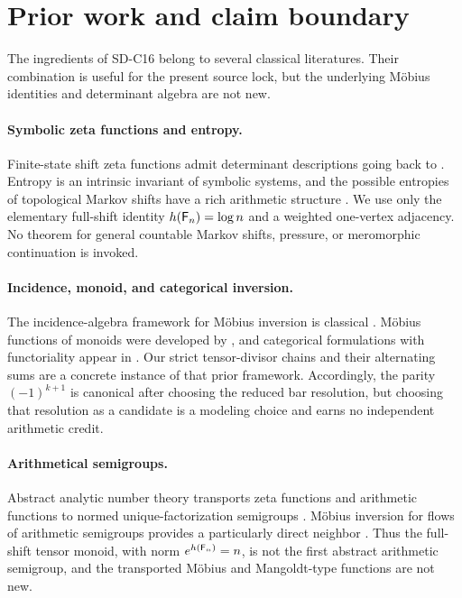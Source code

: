 \section{Prior work and claim boundary}
\label{sec:prior}

The ingredients of SD-C16 belong to several classical literatures.  Their
combination is useful for the present source lock, but the underlying
M\"obius identities and determinant algebra are not new.

\paragraph{Symbolic zeta functions and entropy.}
Finite-state shift zeta functions admit determinant descriptions going back
to \citet{bowenlanford1970}.  Entropy is an intrinsic invariant of symbolic
systems, and the possible entropies of topological Markov shifts have a rich
arithmetic structure \citep{lind1984}.  We use only the elementary full-shift
identity $h(\mathsf F_n)=\log n$ and a weighted one-vertex adjacency.  No theorem for
general countable Markov shifts, pressure, or meromorphic continuation is
invoked.

\paragraph{Incidence, monoid, and categorical inversion.}
The incidence-algebra framework for M\"obius inversion is classical
\citep{rota1964}.  M\"obius functions of monoids were developed by
\citet{cartierfoata1969}, and categorical formulations with functoriality
appear in \citet{contentlemayleroux1980}.  Our strict tensor-divisor chains and
their alternating sums are a concrete instance of that prior framework.
Accordingly, the parity $(-1)^{k+1}$ is canonical after choosing the reduced
bar resolution, but choosing that resolution as a candidate is a modeling
choice and earns no independent arithmetic credit.

\paragraph{Arithmetical semigroups.}
Abstract analytic number theory transports zeta functions and arithmetic
functions to normed unique-factorization semigroups
\citep{knopfmacher1975semigroups,knopfmacher1975functions}.  M\"obius
inversion for flows of arithmetic semigroups provides a particularly direct
neighbor \citep{benitonavasvarona2008}.  Thus the full-shift tensor monoid,
with norm $e^{h(\mathsf F_n)}=n$, is not the first abstract arithmetic semigroup, and
the transported M\"obius and Mangoldt-type functions are not new.


